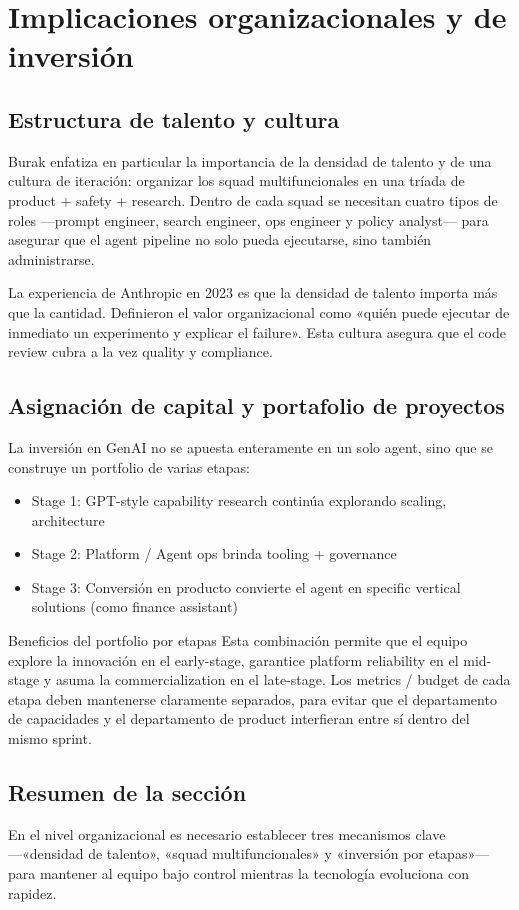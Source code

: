 \section{Implicaciones organizacionales y de inversión}

\subsection{Estructura de talento y cultura}

Burak enfatiza en particular la importancia de la densidad de talento y de una cultura de iteración: organizar los squad multifuncionales en una tríada de product + safety + research. Dentro de cada squad se necesitan cuatro tipos de roles —prompt engineer, search engineer, ops engineer y policy analyst— para asegurar que el agent pipeline no solo pueda ejecutarse, sino también administrarse.

La experiencia de Anthropic en 2023 es que la densidad de talento importa más que la cantidad. Definieron el valor organizacional como «quién puede ejecutar de inmediato un experimento y explicar el failure». Esta cultura asegura que el code review cubra a la vez quality y compliance.

\subsection{Asignación de capital y portafolio de proyectos}

La inversión en GenAI no se apuesta enteramente en un solo agent, sino que se construye un portfolio de varias etapas:

\begin{itemize}
    \item Stage 1: GPT-style capability research continúa explorando scaling, architecture
    \item Stage 2: Platform / Agent ops brinda tooling + governance
    \item Stage 3: Conversión en producto convierte el agent en specific vertical solutions (como finance assistant)
\end{itemize}

\begin{importantbox}{Beneficios del portfolio por etapas}
Esta combinación permite que el equipo explore la innovación en el early-stage, garantice platform reliability en el mid-stage y asuma la commercialization en el late-stage. Los metrics / budget de cada etapa deben mantenerse claramente separados, para evitar que el departamento de capacidades y el departamento de product interfieran entre sí dentro del mismo sprint.
\end{importantbox}

\subsection{Resumen de la sección}

En el nivel organizacional es necesario establecer tres mecanismos clave —«densidad de talento», «squad multifuncionales» y «inversión por etapas»— para mantener al equipo bajo control mientras la tecnología evoluciona con rapidez.

